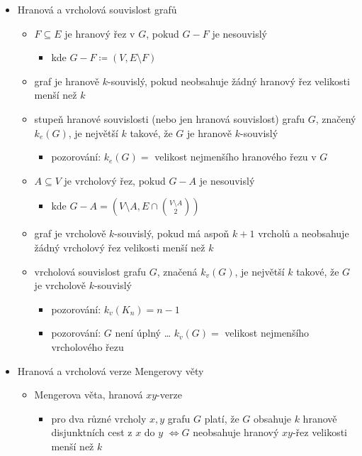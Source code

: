 \begin{itemize}
\begin{itemize}
\item klika v grafu je množina vrcholů taková, že každé dva jsou spojené hranou
\item nezávislá množina v grafu je množina vrcholů taková, že žádné dva vrcholy nejsou spojené hranou
\end{itemize}
\item Hranová a vrcholová souvislost grafů
\begin{itemize}
\item $F\subseteq E$ je hranový řez v $G$, pokud $G-F$ je nesouvislý
\begin{itemize}
\item kde $G-F\coloneqq(V,E\setminus F)$
\end{itemize}
\item graf je hranově $k$-souvislý, pokud neobsahuje žádný hranový řez velikosti menší než $k$
\item stupeň hranové souvislosti (nebo jen hranová souvislost) grafu $G$, značený $k_e(G)$, je největší $k$ takové, že $G$ je hranově $k$-souvislý
\begin{itemize}
\item pozorování: $k_e(G)=$ velikost nejmenšího hranového řezu v $G$
\end{itemize}
\item $A\subseteq V$ je vrcholový řez, pokud $G-A$ je nesouvislý
\begin{itemize}
\item kde $G-A=(V\setminus A,E\cap {V\setminus A\choose 2})$
\end{itemize}
\item graf je vrcholově $k$-souvislý, pokud má aspoň $k+1$ vrcholů a neobsahuje žádný vrcholový řez velikosti menší než $k$
\item vrcholová souvislost grafu $G$, značená $k_v(G)$, je největší $k$ takové, že $G$ je vrcholově $k$-souvislý
\begin{itemize}
\item pozorování: $k_v(K_n)=n-1$
\item pozorování: $G$ není úplný \dots{} $k_v(G)=$ velikost nejmenšího vrcholového řezu
\end{itemize}
\end{itemize}
\item Hranová a vrcholová verze Mengerovy věty
\begin{itemize}
\item Mengerova věta, hranová $xy$-verze
\begin{itemize}
\item pro dva různé vrcholy $x,y$ grafu $G$ platí, že $G$ obsahuje $k$ hranově disjunktních cest z $x$ do $y$ $\iff G$ neobsahuje hranový $xy$-řez velikosti menší než $k$ 

\end{itemize}
\end{itemize}
\end{itemize}
